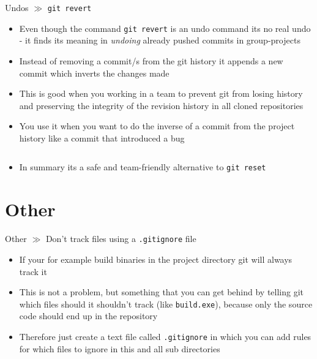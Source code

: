 \documentclass[10pt]{beamer}
\begin{document}
\begin{frame}{Undos $\gg$ \texttt{git revert}}
\begin{itemize}
	\item Even though the command \texttt{git revert} is an undo command its no real undo - it finds its meaning in \textit{undoing} already pushed commits in group-projects
	\item Instead of removing a commit/s from the git history it appends a new commit which inverts the changes made
	\item This is good when you working in a team to prevent git from losing history and preserving the integrity of the revision history in all cloned repositories
	\item You use it when you want to do the inverse of a commit from the project history like a commit that introduced a bug
	\inputminted[bgcolor=lightGreyCustom,fontsize=\scriptsize]{sh}{./resources/git_revert_01_revert.sh}
	\item In summary its a safe and team-friendly alternative to \texttt{git reset}
\end{itemize}
\end{frame}


\section{Other}

\begin{frame}{Other $\gg$ Don't track files using a \texttt{.gitignore} file}
	\begin{itemize}
		\item If your for example build binaries in the project directory git will always track it
		\item This is not a problem, but something that you can get behind by telling git which files should it shouldn't track (like \texttt{build.exe}), because only the source code should end up in the repository
		\item Therefore just create a text file called \texttt{.gitignore} in which you can add rules for which files to ignore in this and all sub directories
		\inputminted[bgcolor=lightGreyCustom,fontsize=\scriptsize]{sh}{./resources/.gitignore}
	\end{itemize}
\end{frame}
\end{document}
